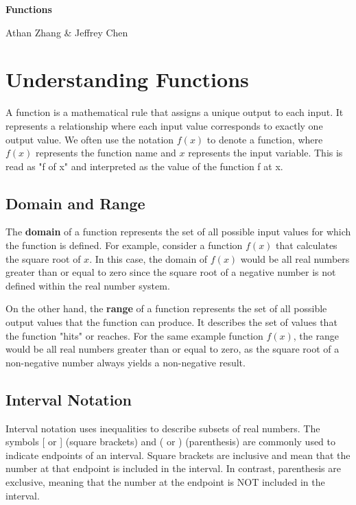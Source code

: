 \documentclass{article}
\begin{document}
\textbf{\Huge Functions}

Athan Zhang \& Jeffrey Chen

\section{Understanding Functions}

A function is a mathematical rule that assigns a unique output to each input. It represents a relationship where each input value corresponds to exactly one output value. We often use the notation $f(x)$ to denote a function, where $f(x)$ represents the function name and $x$ represents the input variable. This is read as "f of x" and interpreted as the value of the function f at x.

\subsection{Domain and Range}

The \textbf{domain} of a function represents the set of all possible input values for which the function is defined. For example, consider a function $f(x)$ that calculates the square root of $x$. In this case, the domain of $f(x)$ would be all real numbers greater than or equal to zero since the square root of a negative number is not defined within the real number system.

On the other hand, the \textbf{range} of a function represents the set of all possible output values that the function can produce. It describes the set of values that the function "hits" or reaches. For the same example function $f(x)$, the range would be all real numbers greater than or equal to zero, as the square root of a non-negative number always yields a non-negative result.

\subsection{Interval Notation}

Interval notation uses inequalities to describe subsets of real numbers. The symbols [ or ] (square brackets) and ( or ) (parenthesis) are commonly used to indicate endpoints of an interval. Square brackets are inclusive and mean that the number at that endpoint is included in the interval. In contrast, parenthesis are exclusive, meaning that the number at the endpoint is NOT included in the interval.
\end{document}

